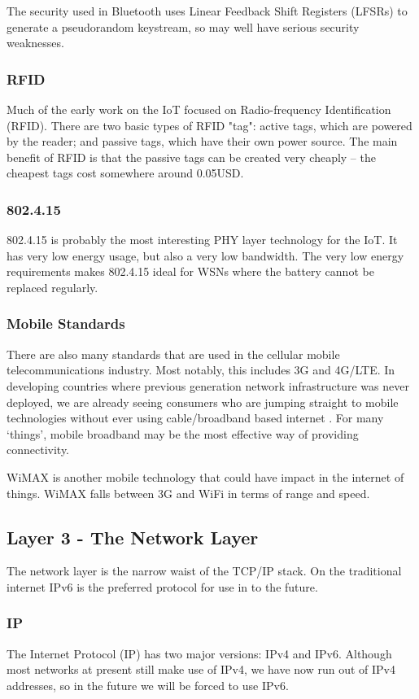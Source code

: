 \documentclass[10pt,journal,compsoc]{IEEEtran}
\begin{document}
The security used in Bluetooth uses Linear Feedback Shift Registers (LFSRs) to
generate a pseudorandom keystream, so may well have serious security
weaknesses.

\subsubsection{RFID}
Much of the early work on the IoT focused on Radio-frequency Identification
(RFID). There are two basic types of RFID "tag": active tags, which are powered
by the reader; and passive tags, which have their own power source. The main
benefit of RFID is that the passive tags can be created very cheaply -- the
cheapest tags cost somewhere around 0.05USD. 

\subsubsection{802.4.15}
802.4.15 is probably the most interesting PHY layer technology for the IoT. It has very
low energy usage, but also a very low bandwidth. The very low energy
requirements makes 802.4.15 ideal for WSNs where the battery cannot be replaced
regularly. 

\subsubsection{Mobile Standards}
There are also many standards that are used in the cellular mobile
telecommunications industry. Most notably, this includes 3G and 4G/LTE. In
developing countries where previous generation network infrastructure was never
deployed, we are already seeing consumers who are jumping straight to mobile
technologies without ever using cable/broadband based internet
\cite{Kritzinger2013}. For many `things', mobile broadband may be the most
effective way of providing connectivity.  

WiMAX is another mobile technology that could have impact in the internet of
things. WiMAX falls between 3G and WiFi in terms of range and speed.  

\subsection{Layer 3 - The Network Layer}
The network layer is the narrow waist of the TCP/IP stack. On the traditional
internet IPv6 is the preferred protocol for use in to the future.

\subsubsection{IP}
The Internet Protocol (IP) has two major versions: IPv4 and IPv6. Although most
networks at present still make use of IPv4, we have now run out of IPv4
addresses, so in the future we will be forced to use IPv6.
\end{document}
